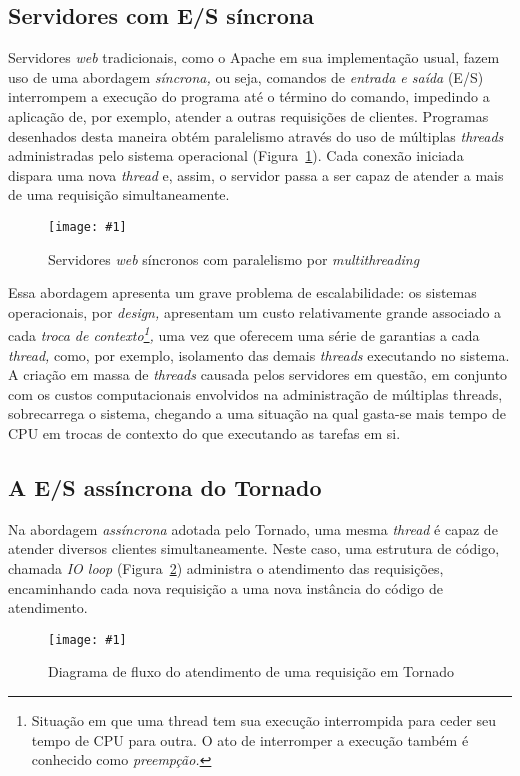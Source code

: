 \documentclass[ruledheader, 12pt]{abnt}
\newcommand{\figcustom}[4]{\par
	\begin{figure}[#3]
		\centering
		\texttt{[image: \#1]}
		\caption{\label{fig:#1}#2}
	\end{figure}
\par}
\newcommand{\fig}[2]{\figcustom{#1}{#2}{bp}{1}}
\newcommand{\figref}[1]{(Figura~\ref{fig:#1})}
\begin{document}
\subsection{Servidores com E/S síncrona}

Servidores \emph{web} tradicionais, como o Apache em sua implementação usual, fazem uso de uma abordagem \emph{síncrona,} ou seja, comandos de \emph{entrada e saída} (E/S) interrompem a execução do programa até o término do comando, impedindo a aplicação de, por exemplo, atender a outras requisições de clientes. Programas desenhados desta maneira obtém paralelismo através do uso de múltiplas \emph{threads} administradas pelo sistema operacional \figref{multithreaded-webservers}. Cada conexão iniciada dispara uma nova \emph{thread} e, assim, o servidor passa a ser capaz de atender a mais de uma requisição simultaneamente.

\figcustom{multithreaded-webservers}{Servidores \emph{web} síncronos com paralelismo por \emph{multithreading}}{bp}{.9}

Essa abordagem apresenta um grave problema de escalabilidade: os sistemas operacionais, por \emph{design,} apresentam um custo relativamente grande associado a cada \emph{troca de contexto\footnote{Situação em que uma thread tem sua execução interrompida para ceder seu tempo de CPU para outra. O ato de interromper a execução também é conhecido como \emph{preempção.}},} uma vez que oferecem uma série de garantias a cada \emph{thread,} como, por exemplo, isolamento das demais \emph{threads} executando no sistema. A criação em massa de \emph{threads} causada pelos servidores em questão, em conjunto com os custos computacionais envolvidos na administração de múltiplas threads, sobrecarrega o sistema, chegando a uma situação na qual gasta-se mais tempo de CPU em trocas de contexto do que executando as tarefas em si.

\subsection{A E/S assíncrona do Tornado}

Na abordagem \emph{assíncrona} adotada pelo Tornado, uma mesma \emph{thread} é capaz de atender diversos clientes simultaneamente. Neste caso, uma estrutura de código, chamada \emph{IO loop} \figref{tornado-ioloop} administra o atendimento das requisições, encaminhando cada nova requisição a uma nova instância do código de atendimento.

\fig{tornado-ioloop}{Diagrama de fluxo do atendimento de uma requisição em Tornado}
\end{document}
